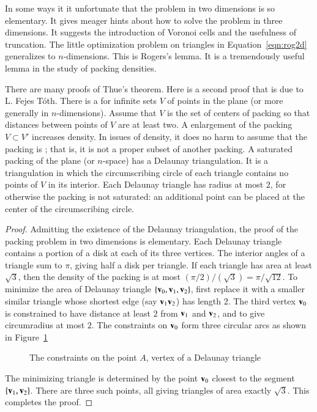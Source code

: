 In some ways it it unfortunate that the problem in two dimensions is
so elementary.  It gives meager hints about how to solve the problem
in three dimensions.  It suggests the introduction of Voronoi cells
and the usefulness of truncation.  The little optimization problem on
triangles in Equation~\ref{eqn:rog2d} generalizes to $n$-dimensions.
This is Rogers's lemma.  It is a tremendously useful lemma in the
study of packing densities.


\bigskip

There are many proofs of Thue's theorem.  Here is a second proof that
is due to L. Fejes T\'oth.  There is a  for infinite sets $V$ of points in the plane (or more
generally in $n$-dimensions).  Assume that $V$ is the set of centers
of packing so that distances between points of $V$ are at least two.
A enlargement of the packing $V\subset V'$ increases density.  In
issues of density, it does no harm to assume that the packing is
; that is, it is not a proper subset of another
packing.  A saturated packing of the plane (or $n$-space) has a
Delaunay triangulation.  It is a triangulation in which the
circumscribing circle of each triangle contains no points of $V$ in
its interior.  Each Delaunay triangle has radius at most $2$, for
otherwise the packing is not saturated: an additional point can be
placed at the center of the circumscribing circle.

\begin{proof}
  Admitting the existence of the Delaunay triangulation, the proof of
  the packing problem in two dimensions is elementary.  Each Delaunay
  triangle contains a portion of a disk at each of its three vertices.
  The interior angles of a triangle sum to $\pi$, giving half a disk
  per triangle.  If each triangle has area at least $\sqrt{3}$, then
  the density of the packing is at most $(\pi/2)/(\sqrt{3}) =
  \pi/\sqrt{12}$.  To minimize the area of Delaunay triangle
  $\{{\mathbf v}_0,{\mathbf v}_1,{\mathbf v}_2\}$, first replace it with a smaller similar triangle
  whose shortest edge (say ${\mathbf v}_1{\mathbf v}_2$) has length $2$.  The third vertex
  ${\mathbf v}_0$ is constrained to have distance at least $2$ from ${\mathbf v}_1$ and
  ${\mathbf v}_2$, and to give circumradius at most $2$.  The constraints on
  ${\mathbf v}_0$ form three circular arcs as shown in
  Figure~\ref{fig:2D-FT} %

\begin{figure}[htb]
  \centering
  \caption{The constraints on the point $A$, vertex of a Delaunay triangle}
  \label{fig:2D-FT}
\end{figure}

The minimizing triangle is determined by the point ${\mathbf v}_0$ closest to
the segment $\{{\mathbf v}_1,{\mathbf v}_2\}$.  There are three such points, all giving
triangles of area exactly $\sqrt3$.  This completes the proof.
\end{proof}

